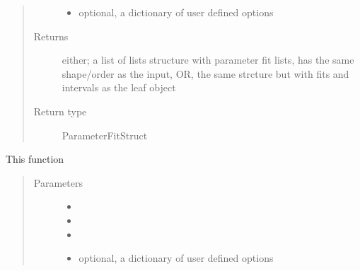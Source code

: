 \documentclass[letterpaper,10pt,english]{sphinxmanual}
\begin{document}
\begin{fulllineitems}
\begin{fulllineitems}
\begin{quote}
\begin{description}
\begin{itemize}
\item {} 
 \textendash{} optional,  a dictionary of user defined options

\end{itemize}

\item[{Returns}] \leavevmode
either; a list of lists structure with parameter fit lists,  has the same shape/order as the input,  OR,  the same strcture but with fits and intervals as the leaf object

\item[{Return type}] \leavevmode
ParameterFitStruct

\end{description}\end{quote}

\end{fulllineitems}


\begin{fulllineitems}
\label{\detokenize{nloed:nloed.model.Model.predict}}
This function
\begin{quote}\begin{description}
\item[{Parameters}] \leavevmode\begin{itemize}
\item {} 
 \textendash{} 

\item {} 
 \textendash{} 

\item {} 
 \textendash{} 

\item {} 
 \textendash{} optional,  a dictionary of user defined options

\end{itemize}

\end{description}\end{quote}


\end{fulllineitems}
\end{fulllineitems}
\end{document}
